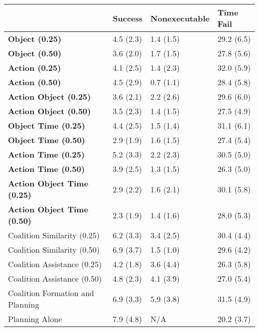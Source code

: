 \begin{tabular}{llll}
\hline
                                    & Success   & Nonexecutable   & Time Fail   \\
\hline
 \textbf{Object (0.25)}             & 4.5 (2.3) & 1.4 (1.5)       & 29.2 (6.5)  \\
 \textbf{Object (0.50)}             & 3.6 (2.0) & 1.7 (1.5)       & 27.8 (5.6)  \\
 \textbf{Action (0.25)}             & 4.1 (2.5) & 1.4 (2.3)       & 32.0 (5.9)  \\
 \textbf{Action (0.50)}             & 4.5 (2.9) & 0.7 (1.1)       & 28.4 (5.8)  \\
 \textbf{Action Object (0.25)}      & 3.6 (2.1) & 2.2 (2.6)       & 29.6 (6.0)  \\
 \textbf{Action Object (0.50)}      & 3.5 (2.3) & 1.4 (1.5)       & 27.5 (4.9)  \\
 \textbf{Object Time (0.25)}        & 4.4 (2.5) & 1.5 (1.4)       & 31.1 (6.1)  \\
 \textbf{Object Time (0.50)}        & 2.9 (1.9) & 1.6 (1.5)       & 27.4 (5.4)  \\
 \textbf{Action Time (0.25)}        & 5.2 (3.3) & 2.2 (2.3)       & 30.5 (5.0)  \\
 \textbf{Action Time (0.50)}        & 3.9 (2.5) & 1.3 (1.5)       & 26.3 (5.0)  \\
 \textbf{Action Object Time (0.25)} & 2.9 (2.2) & 1.6 (2.1)       & 30.1 (5.8)  \\
 \textbf{Action Object Time (0.50)} & 2.3 (1.9) & 1.4 (1.6)       & 28.0 (5.3)  \\
 Coalition Similarity (0.25)        & 6.2 (3.3) & 3.4 (2.5)       & 30.4 (4.4)  \\
 Coalition Similarity (0.50)        & 6.9 (3.7) & 1.5 (1.0)       & 29.6 (4.2)  \\
 Coalition Assistance (0.25)        & 4.2 (1.8) & 3.6 (4.4)       & 26.3 (5.8)  \\
 Coalition Assistance (0.50)        & 4.8 (2.3) & 4.1 (3.9)       & 27.0 (5.4)  \\
 Coalition Formation and Planning   & 6.9 (3.3) & 5.9 (3.8)       & 31.5 (4.9)  \\
 Planning Alone                     & 7.9 (4.8) & N/A             & 20.2 (3.7)  \\
\hline
\end{tabular}